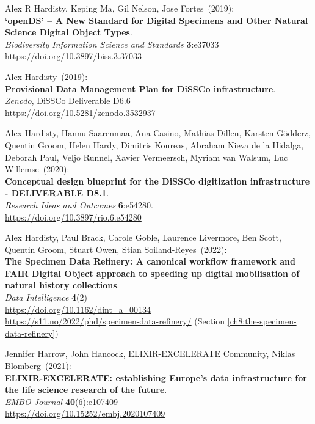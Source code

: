 \begin{thebibliography}{9}
Alex R Hardisty, Keping Ma, Gil Nelson, Jose Fortes~(2019): \\
\textbf{`openDS' -- A New Standard for Digital Specimens and Other Natural Science Digital Object Types}.\\
\emph{Biodiversity Information Science and Standards}
\textbf{3}:e37033\\
\url{https://doi.org/10.3897/biss.3.37033}

Alex Hardisty~(2019): \\
\textbf{Provisional Data Management Plan for DiSSCo infrastructure}.\\ 
\emph{Zenodo}, DiSSCo Deliverable D6.6\\
\url{https://doi.org/10.5281/zenodo.3532937}

Alex Hardisty, Hannu Saarenmaa, Ana Casino, Mathias Dillen, Karsten Gödderz, Quentin Groom, Helen Hardy, Dimitris Koureas, Abraham Nieva de la Hidalga, Deborah Paul, Veljo Runnel, Xavier Vermeersch, Myriam van Walsum, Luc Willemse~(2020): \\
\textbf{Conceptual design blueprint for the DiSSCo digitization infrastructure - DELIVERABLE D8.1}.\\ 
\emph{Research Ideas and Outcomes} \textbf{6}:e54280.\\
\url{https://doi.org/10.3897/rio.6.e54280}

Alex Hardisty, Paul Brack, Carole Goble, Laurence Livermore, Ben Scott, Quentin Groom, Stuart Owen, Stian Soiland-Reyes~(2022): \\
\textbf{The Specimen Data Refinery: A canonical workflow framework and FAIR Digital Object approach to speeding up digital mobilisation of natural history collections}.\\
\emph{Data Intelligence} \textbf{4}(2)\\
\url{https://doi.org/10.1162/dint_a_00134}\\
\url{https://s11.no/2022/phd/specimen-data-refinery/}
(Section \vref{ch8:the-specimen-data-refinery})

Jennifer Harrow, John Hancock, ELIXIR-EXCELERATE Community, Niklas Blomberg~(2021): \\
\textbf{ELIXIR-EXCELERATE: establishing Europe's data infrastructure for the life science research of the future}.\\
\emph{EMBO Journal} \textbf{40}(6):e107409\\
\url{https://doi.org/10.15252/embj.2020107409}


\end{thebibliography}
